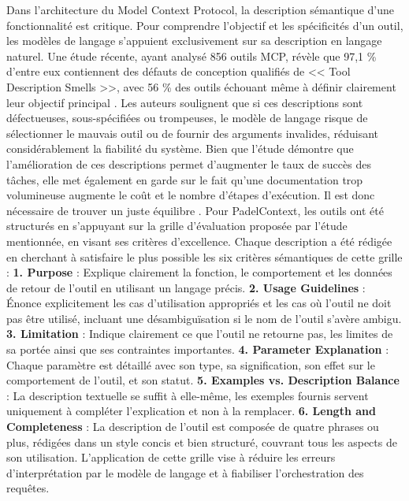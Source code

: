 \documentclass[12pt]{article}
\begin{document}
Dans l'architecture du Model Context Protocol, la description sémantique d'une fonctionnalité est critique. Pour comprendre l'objectif et les spécificités d'un outil, les modèles de langage s'appuient exclusivement sur sa description en langage naturel. Une étude récente, ayant analysé 856 outils MCP, révèle que 97,1 \% d'entre eux contiennent des défauts de conception qualifiés de << Tool Description Smells >>, avec 56 \% des outils échouant même à définir clairement leur objectif principal \parencite[p~4]{hasan_model_2026}. Les auteurs soulignent que si ces descriptions sont défectueuses, sous-spécifiées ou trompeuses, le modèle de langage risque de sélectionner le mauvais outil ou de fournir des arguments invalides, réduisant considérablement la fiabilité du système.
\newline\newline
Bien que l'étude démontre que l'amélioration de ces descriptions permet d'augmenter le taux de succès des tâches, elle met également en garde sur le fait qu'une documentation trop volumineuse augmente le coût et le nombre d'étapes d'exécution. Il est donc nécessaire de trouver un juste équilibre \parencite[p~4]{hasan_model_2026}.
\newline\newline
Pour PadelContext, les outils ont été structurés en s'appuyant sur la grille d'évaluation proposée par l'étude mentionnée, en visant ses critères d'excellence. Chaque description a été rédigée en cherchant à satisfaire le plus possible les six critères sémantiques de cette grille \parencite[p~42]{hasan_model_2026} :
\newline\newline
\textbf{1. Purpose} : Explique clairement la fonction, le comportement et les données de retour de l'outil en utilisant un langage précis.
\newline
\textbf{2. Usage Guidelines} : Énonce explicitement les cas d'utilisation appropriés et les cas où l'outil ne doit pas être utilisé, incluant une désambiguïsation si le nom de l'outil s'avère ambigu.
\newline
\textbf{3. Limitation} : Indique clairement ce que l'outil ne retourne pas, les limites de sa portée ainsi que ses contraintes importantes.
\newline
\textbf{4. Parameter Explanation} : Chaque paramètre est détaillé avec son type, sa signification, son effet sur le comportement de l'outil, et son statut.
\newline
\textbf{5. Examples vs. Description Balance} : La description textuelle se suffit à elle-même, les exemples fournis servent uniquement à compléter l'explication et non à la remplacer.
\newline
\textbf{6. Length and Completeness} : La description de l'outil est composée de quatre phrases ou plus, rédigées dans un style concis et bien structuré, couvrant tous les aspects de son utilisation.
\newline\newline
L'application de cette grille vise à réduire les erreurs d'interprétation par le modèle de langage et à fiabiliser l'orchestration des requêtes.
\end{document}
